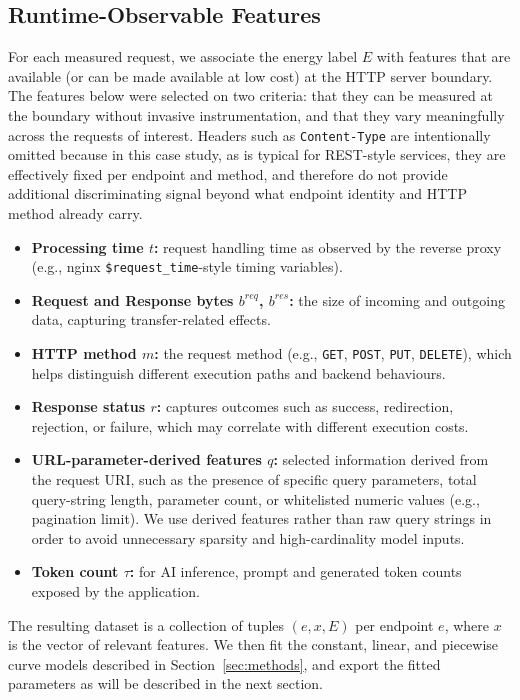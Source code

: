 \documentclass[sigconf]{acmart}
\begin{document}
\subsection{Runtime-Observable Features}
For each measured request, we associate the energy label \(E\) with features that are available (or can be made available at low cost) at the HTTP server boundary. The features below were selected on two criteria: that they can be measured at the boundary without invasive instrumentation, and that they vary meaningfully across the requests of interest. Headers such as \texttt{Content-Type} are intentionally omitted because in this case study, as is typical for REST-style services, they are effectively fixed per endpoint and method, and therefore do not provide additional discriminating signal beyond what endpoint identity and HTTP method already carry.
\begin{itemize}
  \item \textbf{Processing time \(t\):} request handling time as observed by the reverse proxy (e.g., nginx \texttt{\$request\_time}-style timing variables).
  \item \textbf{Request and Response bytes \(b^{req}\), \(b^{res}\):} the size of incoming and outgoing data, capturing transfer-related effects.
  \item \textbf{HTTP method \(m\):} the request method (e.g., \texttt{GET}, \texttt{POST}, \texttt{PUT}, \texttt{DELETE}), which helps distinguish different execution paths and backend behaviours.
  \item \textbf{Response status \(r\):} captures outcomes such as success, redirection, rejection, or failure, which may correlate with different execution costs.
  \item \textbf{URL-parameter-derived features \(q\):} selected information derived from the request URI, such as the presence of specific query parameters, total query-string length, parameter count, or whitelisted numeric values (e.g., pagination limit). We use derived features rather than raw query strings in order to avoid unnecessary sparsity and high-cardinality model inputs.
  \item \textbf{Token count \(\tau\):} for AI inference, prompt and generated token counts exposed by the application.
\end{itemize}

The resulting dataset is a collection of tuples \((e, x, E)\) per endpoint \(e\), where \(x\) is the vector of relevant features. We then fit the constant, linear, and piecewise curve models described in Section~\ref{sec:methods}, and export the fitted parameters as will be described in the next section.
\end{document}
